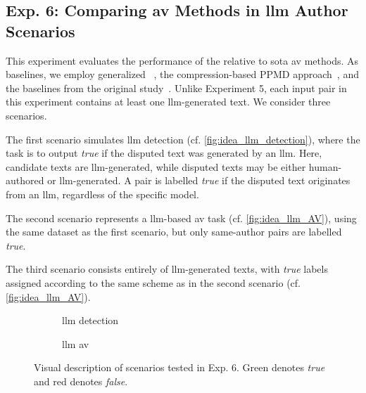 \subsection{Exp. 6: Comparing \acs{av} Methods in \acs{llm} Author Scenarios}

This experiment evaluates the performance of the \impAppr{} relative to \acl{sota} \ac{av} methods. 
As baselines, we employ generalized \unmasking{}~\citep{bevendorff_generalizing_2019}, the compression-based PPMD approach~\citep{stamatatos_survey_2009}, and the baselines from the original \impAppr{} study~\citep{koppel_determining_2014}. 
Unlike Experiment 5, each input pair in this experiment contains at least one \ac{llm}-generated text. 
We consider three scenarios. 

The first scenario simulates \ac{llm} detection (cf. \autoref{fig:idea_llm_detection}), where the task is to output \textit{true} if the disputed text was generated by an \ac{llm}. 
Here, candidate texts are \ac{llm}-generated, while disputed texts may be either human-authored or \ac{llm}-generated. 
A pair is labelled \textit{true} if the disputed text originates from an \ac{llm}, regardless of the specific model. 

The second scenario represents a \ac{llm}-based \ac{av} task (cf. \autoref{fig:idea_llm_AV}), using the same dataset as the first scenario, but only same-author pairs are labelled \textit{true}. 

The third scenario consists entirely of \ac{llm}-generated texts, with \textit{true} labels assigned according to the same scheme as in the second scenario (cf. \autoref{fig:idea_llm_AV}). 

\begin{figure}[htbp]
  \centering
  \begin{subfigure}{0.45\textwidth}
    \centering
    
    \caption{\ac{llm} detection}
    \label{fig:idea_llm_detection}
  \end{subfigure}
  \hfill
  \begin{subfigure}{0.45\textwidth}
    \centering
    
    \caption{\ac{llm} \ac{av}}
    \label{fig:idea_llm_AV}
  \end{subfigure}
  \caption{Visual description of scenarios tested in Exp. 6.
  Green denotes \textit{true} and red denotes \textit{false}.
  }
  \label{fig:ideas_exp6}
\end{figure}

